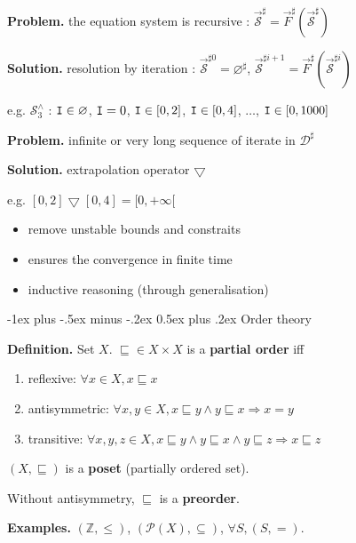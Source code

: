 \documentclass[10pt,landscape]{article}
\makeatletter
\renewcommand{\section}{\@startsection{section}{1}{0mm}%
                                {-1ex plus -.5ex minus -.2ex}%
                                {0.5ex plus .2ex}%
                                {\normalfont\large\bfseries}}
\makeatother
\begin{document}
\begin{multicols}{3}
\textbf{Problem.} the equation system is recursive : $\overrightarrow{\mathcal{S}}^{\sharp} = \overrightarrow{F}^{\sharp} (\overrightarrow{\mathcal{S}}^{\sharp})$

\textbf{Solution.} resolution by iteration : $\overrightarrow{\mathcal{S}}^{\sharp 0} = \varnothing^{\sharp}$, $\overrightarrow{\mathcal{S}}^{\sharp i + 1} = \overrightarrow{F}^{\sharp} (\overrightarrow{\mathcal{S}}^{\sharp i})$

e.g. $\mathcal{S}_3^{\wedge}$ : $\verb!I! \in \varnothing$, $\verb!I! = 0$, $\verb!I! \in [0, 2]$, $\verb!I! \in [0, 4]$, $\dots$, $\verb!I! \in [0, 1000]$

\textbf{Problem.} infinite or very long sequence of iterate in $\mathcal{D}^{\sharp}$

\textbf{Solution.} extrapolation operator $\bigtriangledown$

e.g. $[0, 2] \bigtriangledown [0, 4] = [0, +\infty[$

\begin{itemize}\setlength{\itemsep}{-0.7mm}
\item remove unstable bounds and constraits
\item ensures the convergence in finite time
\item inductive reasoning (through generalisation)
\end{itemize}

\section{Order theory}

\textbf{Definition.} Set $X$. $\sqsubseteq \in X \times X$ is a \textbf{partial order} iff
\begin{enumerate}\setlength{\itemsep}{-0.7mm}
\item reflexive: $\forall x \in X, x \sqsubseteq x$
\item antisymmetric: $\forall x, y \in X, x \sqsubseteq y \wedge y \sqsubseteq x \Rightarrow x = y$
\item transitive: $\forall x, y, z \in X, x \sqsubseteq y \wedge y \sqsubseteq x \wedge y \sqsubseteq z \Rightarrow x \sqsubseteq z$
\end{enumerate}

$(X, \sqsubseteq)$ is a \textbf{poset} (partially ordered set).

Without antisymmetry, $\sqsubseteq$ is a \textbf{preorder}.

\textbf{Examples.} $(\mathbb{Z}, \leq)$, $(\mathcal{P}(X), \subseteq)$, $\forall S, (S, =)$.


\end{multicols}
\end{document}

